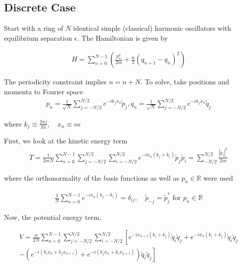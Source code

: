\documentclass[pre,floatfix,onecolumn]{revtex4-2}
\begin{document}
\subsection{Discrete Case}
Start with a ring of $N$ identical simple (classical) harmonic oscillators with equilibrium separation $\epsilon$. The Hamiltonian is given by

\begin{align}
H = \sum_{n=0}^{N-1}\left(\frac{p_{n}^{2}}{2 m} + \frac{\alpha}{2}\left(q_{n+1} - q_{n}\right)^{2}\right)
\end{align}

The periodicity constraint implies $n=n+N$. To solve, take positions and momenta to Fourier space
\begin{equation}
    \begin{gathered}
    p_{n} = \frac{1}{\sqrt{N}} \sum_{j=-N / 2}^{N / 2} e^{-i k_{j} x_{n}} \tilde{p}_{j}
,
     q_{n} = \frac{1}{\sqrt{N}} \sum_{j=-N / 2}^{N / 2} e^{-i k_{j} x_{n}} \tilde{q}_{j}
\end{gathered}
\end{equation}

where $k_{j} \equiv \frac{2 \pi j}{N \epsilon}, \quad x_{n} \equiv n \epsilon $

First, we look at the kinetic energy term 
\begin{equation}
\begin{aligned}
    T = \frac{1}{2 m N} \sum_{n=0}^{N-1} \sum_{j=-N / 2}^{N / 2} \sum_{i=-N / 2}^{N / 2} e^{-i x_{n}\left(k_{j}+k_{i}\right)} \tilde{p}_{j} \tilde{p}_{i} = \sum_{-N / 2}^{N / 2} \frac{\left|\tilde{p}_{j}\right|^{2}}{2 m}
\end{aligned}
    \end{equation}


where the orthonormality of the basis functions as well as $p_{n} \in \mathbb{R}$ were used

\begin{align}
\frac{1}{N} \sum_{n=0}^{N-1} e^{-i x_{n}\left(k_{j}-k_{i}\right)} = \delta_{i j}, \quad \tilde{p}_{-j} = \tilde{p}_{j}^{*} \text { for } p_{n} \in \mathbb{R}
\end{align}

Now, the potential energy term.

\begin{widetext}
    \begin{align}
V = \frac{\alpha}{2 N} \sum_{n=0}^{N-1} \sum_{j=-N / 2}^{N / 2} \sum_{i=-N / 2}^{N / 2}\left[e^{-i x_{n+1}\left(k_{i}+k_{j}\right)} \tilde{q}_{i} \tilde{q}_{j}\right. 
 +e^{-i x_{n}\left(k_{i}+k_{j}\right)} \tilde{q}_{i} \tilde{q}_{j} 
\\\left.-\left(e^{-i\left(k_{i} x_{n}+k_{j} x_{n+1}\right)}+e^{-i\left(k_{j} x_{n}+k_{i} x_{n+1}\right)}\right) \tilde{q}_{i} \tilde{q}_{j}\right]
    \end{align}
\end{widetext}
\end{document}
